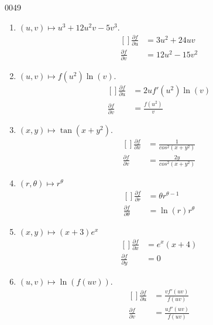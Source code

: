 
\begin{corrige}{0049}

\begin{enumerate}
\item $(u,v)\mapsto  u^3+12u^2v-5v^3$.
\begin{equation}
	\begin{aligned}[]
\frac{ \partial f }{ \partial u } &= 3u^2+24uv\\
\frac{ \partial f }{ \partial v } &= 12u^2-15v^2
\end{aligned}
\end{equation}

\item
$(u,v)\mapsto  f(u^2)\ln(v)$.
\begin{equation}
	\begin{aligned}[]
		\frac{\partial f}{\partial u} &= 2uf'(u^2)\ln(v)\\
		\frac{\partial f}{\partial v} &= \frac{f(u^2)}{v}
	\end{aligned}
\end{equation}

\item
$(x,y)\mapsto \tan(x+y^2)$.
\begin{equation}
	\begin{aligned}[]
		\frac{\partial f}{\partial x} &=\frac{1}{cos^2(x+y^2)}\\
		\frac{\partial f}{\partial v} &= \frac{2y}{cos^2(x+y^2)}
	\end{aligned}
\end{equation}

\item
$(r,\theta)\mapsto  r^\theta$
\begin{equation}
	\begin{aligned}[]
		\frac{ \partial f }{ \partial r } &=\theta r^{\theta-1}\\
		\frac{ \partial f }{ \partial \theta } &=\ln(r)r^\theta
	\end{aligned}
\end{equation}

\item
$(x,y)\mapsto (x+3)e^x$
\begin{equation}
	\begin{aligned}[]
		\frac{\partial f}{\partial x} &=e^x(x+4)\\
		\frac{\partial f}{\partial y} &=0
	\end{aligned}
\end{equation}

\item
$(u,v)\mapsto  \ln(f(uv)) $.
\begin{equation}
	\begin{aligned}[]
		\frac{\partial f}{\partial u} &= \frac{vf'(uv)}{f(uv)}\\
		\frac{\partial f}{\partial v} &= \frac{uf'(uv)}{f(uv)}
	\end{aligned}
\end{equation}


\end{enumerate}

\end{corrige}
